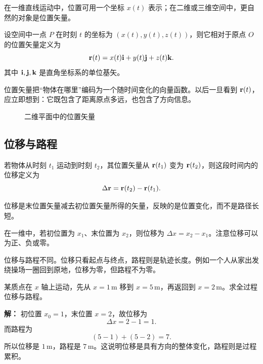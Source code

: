 在一维直线运动中，位置可用一个坐标 $x(t)$ 表示；在二维或三维空间中，更自然的对象是位置矢量。

\begin{definition}[位置矢量]
设空间中一点 $P$ 在时刻 $t$ 的坐标为 $(x(t),y(t),z(t))$，则它相对于原点 $O$ 的位置矢量定义为
\[
\vb{r}(t)=x(t)\vb{i}+y(t)\vb{j}+z(t)\vb{k}.
\]
其中 $\vb{i},\vb{j},\vb{k}$ 是直角坐标系的单位基矢。
\end{definition}

位置矢量把``物体在哪里''编码为一个随时间变化的向量函数。以后一旦看到 $\vb{r}(t)$，应立即想到：它既包含了距离原点多远，也包含了方向信息。

\begin{figure}[H]
\centering
{}
\caption{二维平面中的位置矢量}
\end{figure}

\subsection{位移与路程}

若物体从时刻 $t_1$ 运动到时刻 $t_2$，其位置矢量从 $\vb{r}(t_1)$ 变为 $\vb{r}(t_2)$，则这段时间内的位移定义为
\[
\Delta \vb{r}=\vb{r}(t_2)-\vb{r}(t_1).
\]

\begin{definition}[位移]
位移是末位置矢量减去初位置矢量所得的矢量，反映的是位置变化，而不是路径长短。
\end{definition}

在一维中，若初位置为 $x_1$、末位置为 $x_2$，则位移为 $\Delta x=x_2-x_1$。注意位移可以为正、负或零。

\begin{remark}
位移与路程不同。位移只看起点与终点，路程则是轨迹长度。例如一个人从家出发绕操场一圈回到原地，位移为零，但路程不为零。
\end{remark}

\begin{example}[往返运动中的位移]
某质点在 $x$ 轴上运动，先从 $x=1\,
\text{m}$ 移到 $x=5\,\text{m}$，再返回到 $x=2\,\text{m}$。求全过程位移与路程。

\textbf{解：}
初位置 $x_0=1$，末位置 $x=2$，故位移为
\[
\Delta x=2-1=1.
\]
而路程为
\[
(5-1)+(5-2)=7.
\]
所以位移是 $1\,\text{m}$，路程是 $7\,\text{m}$。这说明位移是具有方向的整体变化，路程则是过程累积。
\end{example}

